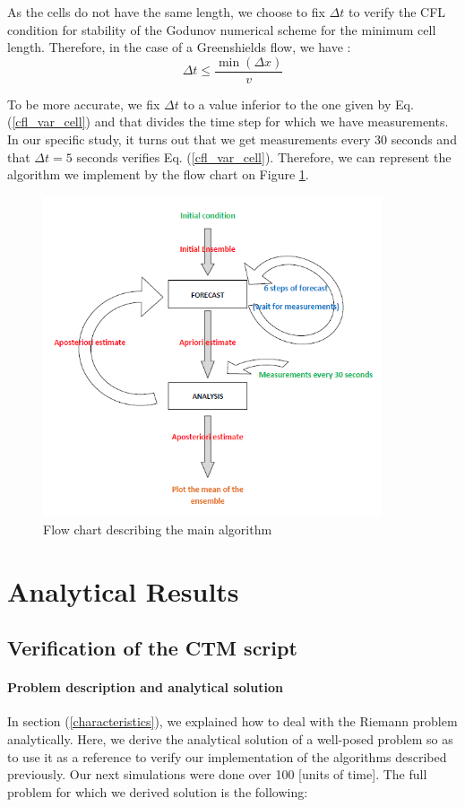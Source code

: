 \documentclass[letterpaper,10pt]{article}
\begin{document}
As the cells do not have the same length, we choose to fix $\Delta t$ to verify the CFL condition for stability of the Godunov numerical scheme for the minimum cell length. Therefore, in the case of a Greenshields flow, we have :
\begin{equation}\label{cfl_var_cell}
\Delta t \leq \frac{\min(\Delta x )}{v}
\end{equation}

To be more accurate, we fix $\Delta t$ to a value inferior to the one given by Eq. (\ref{cfl_var_cell}) and that divides the time step for which we have measurements. In our specific study, it turns out that we get measurements every 30 seconds and that $\Delta t = 5$ seconds verifies Eq. (\ref{cfl_var_cell}). Therefore, we can represent the algorithm we implement by the flow chart on Figure \ref{main_algo}.
\begin{figure}
\centering
\includegraphics[width=10cm]{figures/main_algo.png}
\caption{Flow chart describing the main algorithm}
\label{main_algo}
\end{figure}


\newpage
\section{Analytical Results}
\subsection{Verification of the CTM script}\label{verif_ctm}

\paragraph{Problem description and analytical solution}\label{analytical}
In section (\ref{characteristics}), we explained how to deal with the Riemann problem analytically. Here, we derive the analytical solution of a well-posed problem so as to use it as a reference to verify our implementation of the algorithms described previously. Our next simulations were done over 100  [units of time]. The full problem for which we derived solution is the following:
\end{document}
